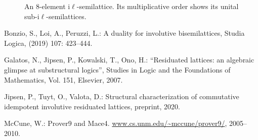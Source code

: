 \documentclass[12pt]{amsart}
\begin{document}
\begin{figure}%
  \begin{center}
  \qquad \qquad
\end{center}
  \caption{An 8-element i$\ell$-semilattice. Its multiplicative order shows its unital sub-i$\ell$-semilattices.}
  \label{subsemilattice}
\end{figure}
\clearpage
\begin{thebibliography}{9}
Bonzio, S., Loi, A., Peruzzi, L.: A duality for involutive bisemilattices, Studia Logica, (2019) 107: 423--444.

Galatos, N., Jipsen, P., Kowalski, T., Ono, H.: ``Residuated
lattices: an algebraic glimpse at substructural logics'', Studies
in Logic and the Foundations of Mathematics, Vol. 151, Elsevier, 2007.


Jipsen, P., Tuyt, O., Valota, D.: Structural characterization of commutative idempotent involutive residuated lattices, preprint, 2020.

McCune, W.: Prover9 and Mace4. \url{www.cs.unm.edu/~mccune/prover9/}, 2005–2010.
\end{thebibliography}
\end{document}

